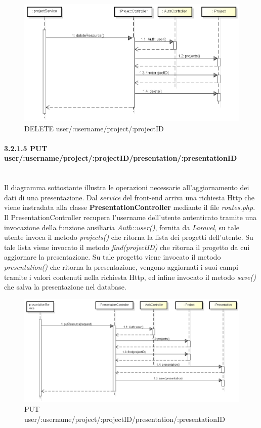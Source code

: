 	\begin{figure}[h]
		\centering
		\includegraphics[width=0.6\linewidth]{img/DELETE_project}
		\caption[DELETE user/:username/project/:projectID]{DELETE user/:username/project/:projectID}
		\label{fig:DELETE user/:username/project/:projectID}
	\end{figure}
	
\newpage

\paragraph{3.2.1.5 PUT user/:username/project/:projectID/presentation/:presentationID}\mbox{}\\
Il diagramma sottostante illustra le operazioni necessarie all'aggiornamento dei dati di una presentazione. Dal \textit{service} del front-end arriva una richiesta Http che viene instradata alla classe \textbf{PresentationController} mediante il file \textit{routes.php}. Il PresentationController recupera l'username dell'utente autenticato tramite una invocazione della funzione ausiliaria \textit{Auth::user()}, fornita da \textit{Laravel}, su tale utente invoca il metodo \textit{projects()} che ritorna la lista dei progetti dell'utente. Su tale lista viene invocato il metodo \textit{find(projectID)} che ritorna il progetto da cui aggiornare la presentazione. Su tale progetto viene invocato il metodo \textit{presentation()} che ritorna la presentazione, vengono aggiornati i suoi campi tramite i valori contenuti nella richiesta Http, ed infine invocato il metodo \textit{save()} che salva la presentazione nel database.

\begin{figure}[h]
	\centering
	\includegraphics[width=0.6\linewidth]{img/PUTpresentation}
	\caption[PUT user/:username/project/:projectID/presentation/:presentationID]{PUT user/:username/project/:projectID/presentation/:presentationID}
	\label{fig:PUT user/:username/project/:projectID/presentation/:presentationID}
\end{figure}


